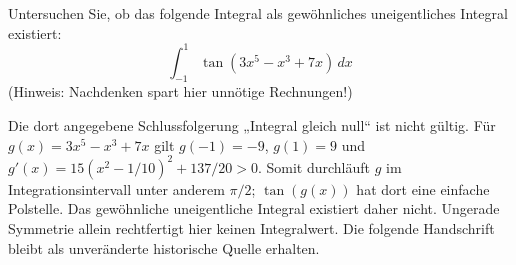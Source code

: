 \begin{ExerciseBlock}
Untersuchen Sie, ob das folgende Integral als gewöhnliches uneigentliches Integral existiert:
\begin{equation*}
	\int_{-1}^1 \tan\left( 3x^5-x^3+7x \right) \, dx
\end{equation*}
(Hinweis: Nachdenken spart hier unnötige Rechnungen!)

\end{ExerciseBlock}
\begin{Solution}
\begin{RemarkBox}[title=Fachliche Korrektur zur folgenden Original-PDF]
Die dort angegebene Schlussfolgerung „Integral gleich null“ ist nicht gültig.
Für $g(x)=3x^5-x^3+7x$ gilt $g(-1)=-9$, $g(1)=9$ und
$g'(x)=15(x^2-1/10)^2+137/20>0$.
Somit durchläuft $g$ im Integrationsintervall unter anderem $\pi/2$;
$\tan(g(x))$ hat dort eine einfache Polstelle.
Das gewöhnliche uneigentliche Integral existiert daher nicht.
Ungerade Symmetrie allein rechtfertigt hier keinen Integralwert.
Die folgende Handschrift bleibt als unveränderte historische Quelle erhalten.
\end{RemarkBox}
\end{Solution}
